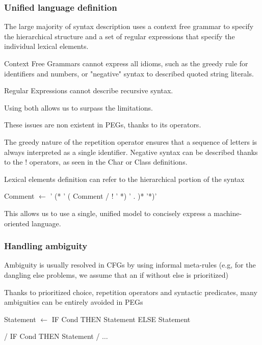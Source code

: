 \begin{frame}
	\frametitle{Unified language definition}
	
\begin{block}{}	The large majority of syntax description uses a context free grammar to specify the hierarchical structure and a set of regular expressions that specify the individual lexical elements.

\end{block}
\begin{block}{}
	Context Free Grammars cannot express all idioms, such as the greedy rule for identifiers and numbers, or "negative" syntax to described quoted string literals. 
\end{block}
\begin{block}{}
	Regular Expressions cannot describe recursive syntax.
\end{block}
\begin{block}{}
		Using both allows us to surpass the limitations.
\end{block}
\end{frame}
\begin{frame}
	\begin{block}{}
			These issues are non existent in PEGs, thanks to its operators. 
	\end{block}
	\begin{block}{}
		The greedy nature of the repetition operator ensures that a sequence of letters is always interpreted as a single identifier.  Negative syntax can be described thanks to the ! operators, as seen in the Char or Class definitions. 
	\end{block}
\begin{block}{}
	Lexical elements definition can refer to the hierarchical portion of the syntax
	\begin{center}
		\footnotesize
		Comment $\leftarrow$  ' (* '    ( Comment /  !  ’ *) ’   . )*        ’*)’
	\end{center}
\end{block}
\begin{block}{}
	This allows us to use a single, unified model to concisely express a machine-oriented language.
\end{block}
\end{frame}

\begin{frame}
	\frametitle{Handling ambiguity}

	\begin{block}{}
	 Ambiguity is usually resolved in CFGs by using informal meta-rules (e.g, for the dangling else problems, we assume that an if without else is prioritized)
\end{block} 
	 \begin{block}{}
	 	Thanks to prioritized choice, repetition operators and syntactic predicates, many ambiguities can  be entirely avoided in PEGs
	 \end{block}
 	\begin{center}
 		Statement $\leftarrow$ IF Cond THEN  Statement ELSE Statement 
 		
 		/	IF Cond THEN Statement  / 	$\dots$	
 	\end{center}
\end{frame}

